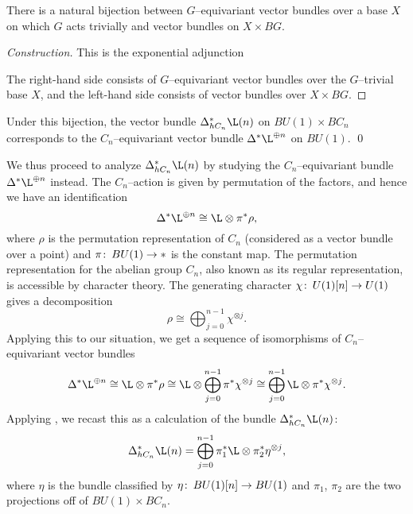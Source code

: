 \begin{theorem}\label{GEquivBundlesVsBundlesOverBG}
There is a natural bijection between \(G\)--equivariant vector bundles over a base \(X\) on which \(G\) acts trivially and vector bundles on \(X \times BG\).
\end{theorem}
\begin{proof}[Construction]
This is the exponential adjunction
\begin{center}
\end{center}
The right-hand side consists of \(G\)--equivariant vector bundles over the \(G\)--trivial base \(X\), and the left-hand side consists of vector bundles over \(X \times BG\).
\end{proof}

\begin{corollary}
Under this bijection, the vector bundle \(\Delta_{hC_n}^* \L(n)\) on \(BU(1) \times BC_n\) corresponds to the \(C_n\)--equivariant vector bundle \(\Delta^* \L^{\oplus n}\) on \(BU(1)\). \qed
\end{corollary}

We thus proceed to analyze \(\Delta^*_{hC_n} \L(n)\) by studying the \(C_n\)--equivariant bundle \(\Delta^* \L^{\oplus n}\) instead.  The \(C_n\)--action is given by permutation of the factors, and hence we have an identification \[\Delta^* \L^{\oplus n} \cong \L \otimes \pi^* \rho,\] where \(\rho\) is the permutation representation of \(C_n\) (considered as a vector bundle over a point) and \(\pi\colon\thinspace BU(1) \to *\) is the constant map.  The permutation representation for the abelian group \(C_n\), also known as its regular representation, is accessible by character theory.  The generating character \(\chi\colon\thinspace U(1)[n] \to U(1)\) gives a decomposition \[\rho \cong \bigoplus_{j=0}^{n-1} \chi^{\otimes j}.\]  Applying this to our situation, we get a sequence of isomorphisms of \(C_n\)--equivariant vector bundles \[\Delta^* \L^{\oplus n} \cong \L \otimes \pi^* \rho \cong \L \otimes \bigoplus_{j=0}^{n-1} \pi^* \chi^{\otimes j} \cong \bigoplus_{j=0}^{n-1} \L \otimes \pi^* \chi^{\otimes j}.\]  Applying , we recast this as a calculation of the bundle \(\Delta_{hC_n}^* \L(n)\): \[\Delta_{hC_n}^* \L(n) = \bigoplus_{j=0}^{n-1} \pi_1^* \L \otimes \pi_2^* \eta^{\otimes j},\] where \(\eta\) is the bundle classified by \(\eta\colon\thinspace BU(1)[n] \to BU(1)\) and \(\pi_1\), \(\pi_2\) are the two projections off of \(BU(1) \times BC_n\).

